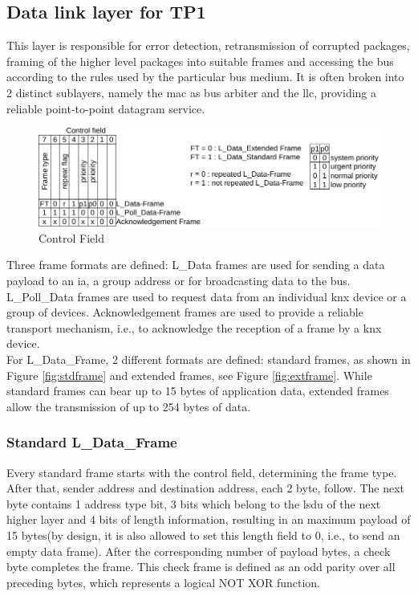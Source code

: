 \subsection{Data link layer for TP1}

This layer is responsible for error detection, retransmission of corrupted 
packages, framing of the higher level packages into suitable frames and accessing the bus according to the rules used by the particular bus medium. 
It is often broken into 2 distinct sublayers, namely the \gls{mac} as bus arbiter and the \gls{llc}, providing a reliable point-to-point datagram service.
\begin{figure}
    \centering
    \includegraphics[width=1\textwidth]{figures/ctrl}
    \caption{Control Field}
    \label{fig:ctrlfield}
\end{figure}
Three frame formats are defined: L\_Data frames are used for sending a data payload to an \gls{ia}, a group address or for broadcasting data to
the bus. L\_Poll\_Data frames are used to request data from an individual \gls{knx} device or a group of devices. Acknowledgement frames are used to provide a reliable
transport mechanism, i.e., to acknowledge the reception of a frame by a \gls{knx} device. 
\\
For L\_Data\_Frame, 2 different formats are defined: standard frames, as shown in Figure \ref{fig:stdframe} and extended frames, see Figure \ref{fig:extframe}.
While standard frames can bear up to
15 bytes of application data, extended frames allow the transmission of up to 254 bytes of data.

\subsubsection{Standard L\_Data\_Frame}

Every standard frame starts with the control field, determining the frame type. 
After that, sender address and destination address, each 2 byte, follow.
The next byte contains 1 address type bit, 3 bits which belong to the \gls{lsdu} of the next higher layer
and 4 bits of length information, resulting in an maximum payload of 15 bytes(by design, it is also allowed to set this length
field to 0, i.e., to send an empty data frame). After the corresponding number of payload bytes, a check byte completes the frame. This check
frame is defined as an odd parity over all preceding bytes, which represents a logical NOT XOR function. 

